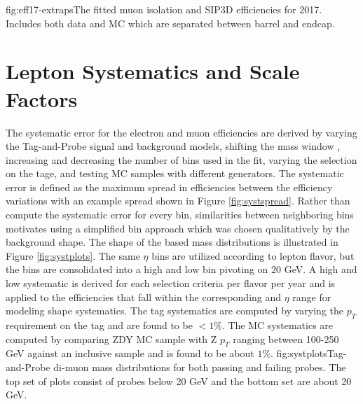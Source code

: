 
%
          {fig:eff17-extraps}{The fitted muon isolation and SIP3D efficiencies for 2017. Includes both data and MC which are separated between barrel and endcap.  }




\FloatBarrier
\section{Lepton Systematics and Scale Factors}

The systematic error for the electron and muon efficiencies are derived by varying the Tag-and-Probe signal and background models, shifting the mass window , increasing and decreasing the number of bins used in the fit, varying the selection on the tage, and testing MC samples with different generators. The systematic error is defined as the maximum spread in efficiencies between the efficiency variations with an example spread shown in Figure \ref{fig:systspread}.  Rather than compute the systematic error for every bin, similarities between neighboring bins motivates using a simplified bin approach which was chosen qualitatively by the background shape. The shape of the \pt based mass distributions is illustrated in Figure \ref{fig:systplots}. The same $\eta$ bins are utilized according to lepton flavor, but the \pt bins are consolidated into a high and low bin pivoting on $20$ GeV. A high and low systematic is derived for each selection criteria per flavor per year and is applied to the efficiencies that fall within the corresponding \pt and $\eta$ range for modeling shape systematics. The tag systematics are computed by varying the $p_T$ requirement on the tag and are found to be $<1\%$. The MC systematics are computed by comparing ZDY MC sample with Z $p_T$ ranging between 100-250 GeV against an inclusive sample and is found to be about $1\%$. 
%
	{fig:systplots}{Tag-and-Probe di-muon mass distributions for both passing and failing probes. The top set of plots consist of probes below 20 GeV and the bottom set are about 20 GeV.}
	


